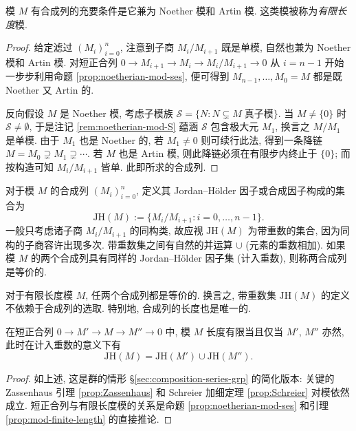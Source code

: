 \begin{lemma}\label{prop:mod-finite-length}
	模 $M$ 有合成列的充要条件是它兼为 Noether 模和 Artin 模. 这类模被称为\emph{有限长度}模.
\end{lemma}
\begin{proof}
	给定滤过 $(M_i)_{i=0}^n$, 注意到子商 $M_i/M_{i+1}$ 既是单模, 自然也兼为 Noether 模和 Artin 模. 对短正合列 $0 \to M_{i+1} \to M_i \to M_i/M_{i+1} \to 0$ 从 $i=n-1$ 开始一步步利用命题 \ref{prop:noetherian-mod-ses}, 便可得到 $M_{n-1}, \ldots, M_0 = M$ 都是既 Noether 又 Artin 的.
	
	反向假设 $M$ 是 Noether 模, 考虑子模族 $\mathcal{S} = \{N : N \subsetneq M \; \text{真子模}\}$. 当 $M \neq \{0\}$ 时 $\mathcal{S} \neq \emptyset$, 于是注记 \ref{rem:noetherian-mod-S} 蕴涵 $\mathcal{S}$ 包含极大元 $M_1$, 换言之 $M/M_1$ 是单模. 由于 $M_1$ 也是 Noether 的, 若 $M_1 \neq 0$ 则可续行此法, 得到一条降链 $M = M_0 \supsetneq M_1 \supsetneq \cdots$. 若 $M$ 也是 Artin 模, 则此降链必须在有限步内终止于 $\{0\}$; 而按构造可知 $M_i/M_{i+1}$ 皆单. 此即所求的合成列.
\end{proof}

对于模 $M$ 的合成列 $(M_i)_{i=0}^n$, 定义其 Jordan--Hölder 因子或合成因子构成的集合为 
\[ \text{JH}(M) := \{M_i/M_{i+1} : i=0, \ldots, n-1 \}. \]
一般只考虑诸子商 $M_i/M_{i+1}$ 的同构类, 故应视 $\text{JH}(M)$ 为带重数的集合, 因为同构的子商容许出现多次. 带重数集之间有自然的并运算 $\cup$ (元素的重数相加). 如果模 $M$ 的两个合成列具有同样的 Jordan--Hölder 因子集 (计入重数), 则称两合成列是等价的.

\begin{theorem}\label{prop:JH-mod}
	对于有限长度模 $M$, 任两个合成列都是等价的. 换言之, 带重数集 $\text{JH}(M)$ 的定义不依赖于合成列的选取. 特别地, 合成列的长度也是唯一的.
	
	在短正合列 $0 \to M' \to M \to M'' \to 0$ 中, 模 $M$ 长度有限当且仅当 $M'$, $M''$ 亦然, 此时在计入重数的意义下有
	\[ \text{JH}(M) = \text{JH}(M') \cup \text{JH}(M''). \]
\end{theorem}
\begin{proof}
	如上述, 这是群的情形 \S\ref{sec:composition-series-grp} 的简化版本: 关键的 Zassenhaus 引理 \ref{prop:Zassenhaus} 和 Schreier 加细定理 \ref{prop:Schreier} 对模依然成立. 短正合列与有限长度模的关系是命题 \ref{prop:noetherian-mod-ses} 和引理 \ref{prop:mod-finite-length} 的直接推论.
\end{proof}

